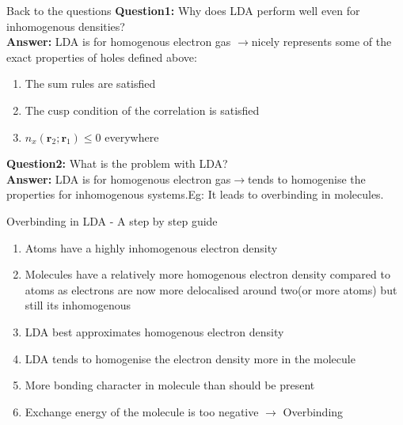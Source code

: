 \documentclass{beamer}
\begin{document}
	\begin{frame}[t]{Back to the questions}
	\textbf{Question1:} Why does LDA perform well even for inhomogenous densities?\\
	\textbf{Answer: }LDA is for homogenous electron gas $\rightarrow$nicely represents some of the exact properties of holes defined above:
	\begin{enumerate}
	\item{The sum rules are satisfied}
	\item{The cusp condition of the correlation is satisfied}
	\item{$n_x(\textbf{r}_2;\textbf{r}_1)\leqslant 0 $ everywhere}
	\end{enumerate}
	\vspace{0.5cm}
	\textbf{Question2:} What is the problem with LDA?\\
	\textbf{Answer: } LDA is for homogenous electron gas$\rightarrow$tends to homogenise the properties for inhomogenous systems.Eg: It leads to overbinding in molecules.
	\end{frame}
	
	\begin{frame}[t]{Overbinding in LDA - A step by step guide}
	\begin{enumerate}
	\item{Atoms have a highly inhomogenous electron density}
	\item{Molecules have a relatively more homogenous electron density compared to atoms as electrons are now more delocalised around two(or more atoms) but still its inhomogenous}
	\item{LDA best approximates homogenous electron density}
	\item{LDA tends to homogenise the electron density more in the molecule}
	\item{More bonding character in molecule than should be present}
	\item{Exchange energy of the molecule is too negative $\rightarrow$ Overbinding}
	\end{enumerate}
	\end{frame}
	
\end{document}
